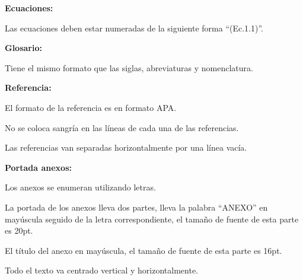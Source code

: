 {{\begin{lista}
    \item\textbf{Ecuaciones:}
    \begin{lista}
        \item Las ecuaciones deben estar numeradas de la siguiente forma “(Ec.1.1)”.
    \end{lista}

    \item \textbf{Glosario:}
    \begin{lista}
        \item Tiene el mismo formato que las siglas, abreviaturas y nomenclatura.
    \end{lista}

    \item\textbf{Referencia:}
    
    \begin{lista}
        \item El formato de la referencia es en formato APA.
        \item No se coloca sangría en las líneas de cada una de las referencias.
        \item Las referencias van separadas horizontalmente por una línea vacía.
    \end{lista}

  

    \item\textbf{Portada anexos:}
    \begin{lista}
        \item Los anexos se enumeran utilizando letras.
        \item La portada de los anexos lleva dos partes, lleva la palabra “ANEXO” en mayúscula seguido de la letra correspondiente, el tamaño de fuente de esta parte es 20pt.
        \item El título del anexo en mayúscula, el tamaño de fuente de esta parte es 16pt.
        \item Todo el texto va centrado vertical y horizontalmente.
    \end{lista}

    \end{lista}
    }
}


